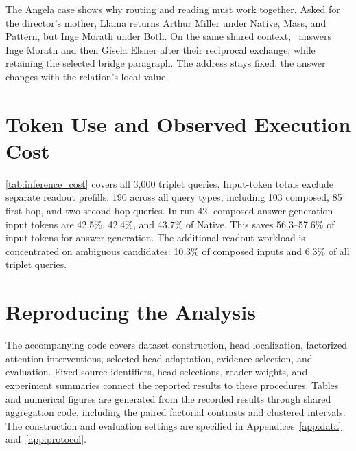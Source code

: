 The Angela case shows why routing and reading must work together. Asked for the director's mother, Llama returns Arthur Miller under Native, Mass, and Pattern, but Inge Morath under Both. On the same shared context, \method\ answers Inge Morath and then Gisela Elsner after their reciprocal exchange, while retaining the selected bridge paragraph. The address stays fixed; the answer changes with the relation's local value.

\section{Token Use and Observed Execution Cost}
\label{app:efficiency}

\cref{tab:inference_cost} covers all 3,000 triplet queries. Input-token totals exclude separate readout prefills: 190 across all query types, including 103 composed, 85 first-hop, and two second-hop queries. In run 42, composed answer-generation input tokens are 42.5\%, 42.4\%, and 43.7\% of Native. This saves 56.3--57.6\% of input tokens for answer generation. The additional readout workload is concentrated on ambiguous candidates: 10.3\% of composed inputs and 6.3\% of all triplet queries.

\begin{table}[!htbp]
  \centering
  \caption{\textbf{Observed inference workload on all 3,000 triplet queries.} Input tokens are final-generation prompt tokens only; output tokens count generated tokens. Readout prefills are listed separately from final-generation input tokens. Entries summarize recorded runs with the displayed batch sizes under shared-device scheduling.}
  \label{tab:inference_cost}
  \small\setlength{\tabcolsep}{4pt}
  
\end{table}

\section{Reproducing the Analysis}
\label{app:reproducibility}
The accompanying code covers dataset construction, head localization, factorized attention interventions, selected-head adaptation, evidence selection, and evaluation. Fixed source identifiers, head selections, reader weights, and experiment summaries connect the reported results to these procedures. Tables and numerical figures are generated from the recorded results through shared aggregation code, including the paired factorial contrasts and clustered intervals. The construction and evaluation settings are specified in Appendices~\ref{app:data} and~\ref{app:protocol}.
